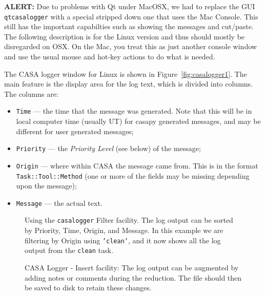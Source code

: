 {\bf ALERT:} Due to problems with Qt under MacOSX, we had to
replace the GUI {\tt qtcasalogger} with a special stripped down one that
uses the Mac Console.  This still has the important capabilties 
such as showing the messages and cut/paste.  The following description
is for the Linux version and thus should mostly be disregarded on OSX.  On
the Mac, you treat this as just another console window and use the
usual mouse and hot-key actions to do what is needed.

The CASA logger window for Linux is shown in Figure~\ref{fig:casalogger1}.  The
main feature is the display area for the log text, which is divided
into columns.  The columns are:
\begin{itemize}
\item {\tt Time} --- the time that the message was generated.  Note
  that this will be in local computer time (usually UT) for casapy
  generated messages, and may be different for user generated messages;
\item {\tt Priority} --- the {\it Priority Level} (see below) of the
  message;
\item {\tt Origin} --- where within CASA the message came from.  This
  is in the format {\tt Task::Tool::Method} (one or more of the fields
  may be missing depending upon the message);
\item {\tt Message} --- the actual text.
\end{itemize}


\begin{figure}[h]
\begin{center}
\caption{\label{fig:logger_filter} Using the {\tt casalogger} Filter
facility.  The log output can be sorted by Priority, Time, Origin, and
Message.  In this example we are filtering by Origin using {\tt 'clean'},
and it now shows all the log output from the {\tt clean} task.}  
\hrulefill
\end{center}
\end{figure}

\begin{figure}[h]
\begin{center}
\caption{\label{fig:logger_insert} CASA Logger - Insert facility: The
log output can be augmented by adding notes or comments during the
reduction. The file should then be saved to disk to retain these
changes.}
\hrulefill
\end{center}
\end{figure}

